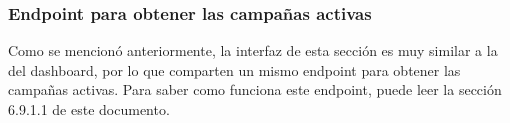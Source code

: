 \subsubsection{Endpoint para obtener las campañas activas}
Como se mencionó anteriormente, la interfaz de esta sección es muy similar a la del dashboard, por lo que comparten un mismo endpoint para obtener las campañas activas. Para saber como funciona este endpoint, puede leer la sección 6.9.1.1 de este documento.